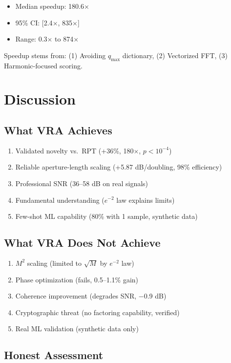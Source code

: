 \documentclass[10pt,twocolumn]{article}
\begin{document}
\begin{itemize}
\item Median speedup: 180.6$\times$
\item 95\% CI: [2.4$\times$, 835$\times$]
\item Range: 0.3$\times$ to 874$\times$
\end{itemize}

Speedup stems from: (1) Avoiding $q_{\max}$ dictionary, (2) Vectorized FFT, (3) Harmonic-focused scoring.

\section{Discussion}

\subsection{What VRA Achieves}

\begin{enumerate}
\item Validated novelty vs.\ RPT (+36\%, 180$\times$, $p < 10^{-4}$)
\item Reliable aperture-length scaling (+5.87 dB/doubling, 98\% efficiency)
\item Professional SNR (36--58 dB on real signals)
\item Fundamental understanding ($e^{-2}$ law explains limits)
\item Few-shot ML capability (80\% with 1 sample, synthetic data)
\end{enumerate}

\subsection{What VRA Does Not Achieve}

\begin{enumerate}
\item $M^2$ scaling (limited to $\sqrt{M}$ by $e^{-2}$ law)
\item Phase optimization (fails, 0.5--1.1\% gain)
\item Coherence improvement (degrades SNR, $-$0.9 dB)
\item Cryptographic threat (no factoring capability, verified)
\item Real ML validation (synthetic data only)
\end{enumerate}

\subsection{Honest Assessment}
\end{document}
